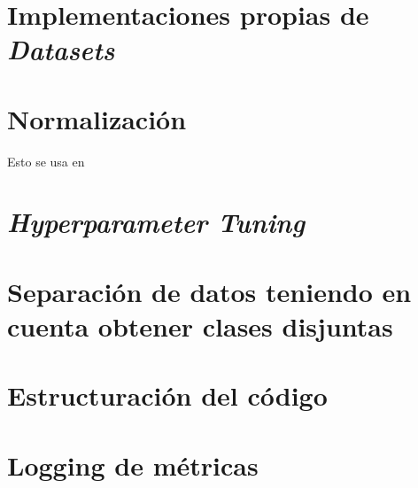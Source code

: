 \section{Implementaciones propias de \textit{Datasets}} \label{isec:datasets_customs}

\section{Normalización}

Esto se usa en \cite{informatica:facenet}

\section{\textit{Hyperparameter Tuning}} \label{isec:hp_tuning}

\section{Separación de datos teniendo en cuenta obtener clases disjuntas}

\section{Estructuración del código}

\section{Logging de métricas} \label{isec:loggin_metricas}


